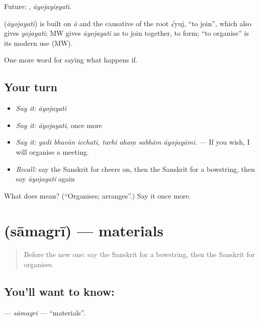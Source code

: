 Future: , \emph{āyojayiṣyati}.

\begin{cousinweb}
\textbf{} (\emph{āyojayati}) is built on \emph{ā} and the causative of the root √yuj, \textquotedblleft{}to join\textquotedblright{}, which also gives \emph{yojayati}; MW gives \emph{āyojayati} as to join together, to form; \textquotedblleft{}to organise\textquotedblright{} is its modern use (MW).
\end{cousinweb}

\begin{grammarlens}[title={What you've built}]
One more word for saying what happens if.
\end{grammarlens}

\subsection*{Your turn}
\begin{itemize}
\raggedright
  \item \emph{Say it:} \emph{āyojayati}
  \item \emph{Say it:} \emph{āyojayati}, once more
  \item \emph{Say it:} \emph{yadi bhavān icchati, tarhi ahaṃ sabhām āyojayāmi.} — If you wish, I will organise a meeting.
  \item \emph{Recall:} say the Sanskrit for cheers on, then the Sanskrit for a bowstring, then say \emph{āyojayati} again
\end{itemize}

\begin{tcolorbox}[breakable,colback=teal!4,colframe=teal!35!black,title={Before you move on}]
What does  mean? (\textquotedblleft{}Organises; arranges\textquotedblright{}.) Say it once more.
\end{tcolorbox}
\section[\texorpdfstring{\sk{सामग्री} (sāmagrī)}{सामग्री (sāmagrī)}]{ (sāmagrī) — materials}

\label{lesson:SA-C528-samagri}



\begin{quote}
Before the new one: say the Sanskrit for a bowstring, then the Sanskrit for organises.
\end{quote}

\subsection*{You'll want to know: }
\textbf{} — \emph{sāmagrī} — \textquotedblleft{}materials\textquotedblright{}.

